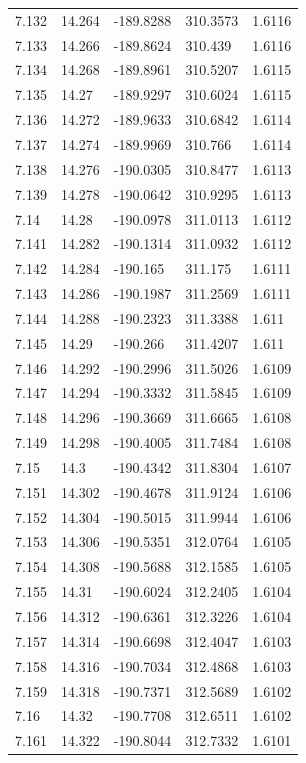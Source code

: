 \begin{tabular}{lllll}
7.132 & 14.264 & -189.8288 & 310.3573 & 1.6116 \\
7.133 & 14.266 & -189.8624 & 310.439 & 1.6116 \\
7.134 & 14.268 & -189.8961 & 310.5207 & 1.6115 \\
7.135 & 14.27 & -189.9297 & 310.6024 & 1.6115 \\
7.136 & 14.272 & -189.9633 & 310.6842 & 1.6114 \\
7.137 & 14.274 & -189.9969 & 310.766 & 1.6114 \\
7.138 & 14.276 & -190.0305 & 310.8477 & 1.6113 \\
7.139 & 14.278 & -190.0642 & 310.9295 & 1.6113 \\
7.14 & 14.28 & -190.0978 & 311.0113 & 1.6112 \\
7.141 & 14.282 & -190.1314 & 311.0932 & 1.6112 \\
7.142 & 14.284 & -190.165 & 311.175 & 1.6111 \\
7.143 & 14.286 & -190.1987 & 311.2569 & 1.6111 \\
7.144 & 14.288 & -190.2323 & 311.3388 & 1.611 \\
7.145 & 14.29 & -190.266 & 311.4207 & 1.611 \\
7.146 & 14.292 & -190.2996 & 311.5026 & 1.6109 \\
7.147 & 14.294 & -190.3332 & 311.5845 & 1.6109 \\
7.148 & 14.296 & -190.3669 & 311.6665 & 1.6108 \\
7.149 & 14.298 & -190.4005 & 311.7484 & 1.6108 \\
7.15 & 14.3 & -190.4342 & 311.8304 & 1.6107 \\
7.151 & 14.302 & -190.4678 & 311.9124 & 1.6106 \\
7.152 & 14.304 & -190.5015 & 311.9944 & 1.6106 \\
7.153 & 14.306 & -190.5351 & 312.0764 & 1.6105 \\
7.154 & 14.308 & -190.5688 & 312.1585 & 1.6105 \\
7.155 & 14.31 & -190.6024 & 312.2405 & 1.6104 \\
7.156 & 14.312 & -190.6361 & 312.3226 & 1.6104 \\
7.157 & 14.314 & -190.6698 & 312.4047 & 1.6103 \\
7.158 & 14.316 & -190.7034 & 312.4868 & 1.6103 \\
7.159 & 14.318 & -190.7371 & 312.5689 & 1.6102 \\
7.16 & 14.32 & -190.7708 & 312.6511 & 1.6102 \\
7.161 & 14.322 & -190.8044 & 312.7332 & 1.6101 \\

\end{tabular}
